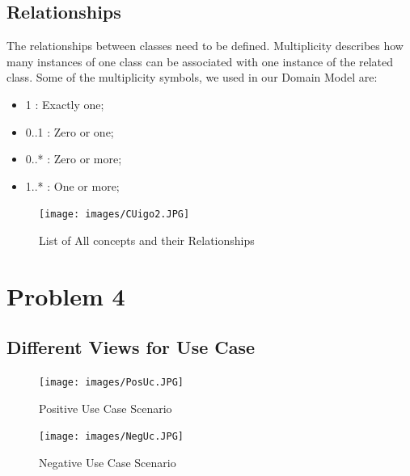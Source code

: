 \documentclass[11pt,oneside]{book}
\begin{document}
\section{Relationships}
The relationships between classes need to be defined. Multiplicity describes how many     instances of one class can be associated with one instance of the related class. 
Some of the multiplicity symbols, we used in our Domain Model are: 
\begin{itemize}
\item   1  :  Exactly one;
\item   0..1  :  Zero or one; 
\item 0..*  :  Zero or more; 
\item 1..*  :  One or more; 

\end{itemize}

\begin{figure}[htp]
\texttt{[image: images/CUigo2.JPG]} 
    \centering
     \caption{List of All concepts and their Relationships}
\end{figure}


\chapter{Problem 4}
\section{Different Views for Use Case}


\begin{figure}[htp]
\texttt{[image: images/PosUc.JPG]} 
    \centering
    \caption{Positive Use Case Scenario}
\end{figure}
\clearpage

\begin{figure}[htp]
\texttt{[image: images/NegUc.JPG]} 
    \centering
    \caption{Negative Use Case Scenario}
\end{figure}
\clearpage
\end{document}
